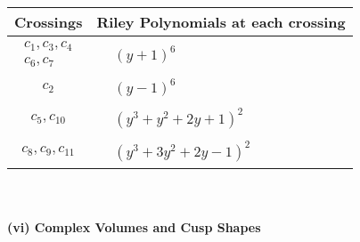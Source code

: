 \documentclass[1p]{elsarticle_modified}
\theoremstyle{definition}
\begin{document}
\begin{tabular}{m{50pt}|m{274pt}}
Crossings & \hspace{64pt}Riley Polynomials at each crossing \\
\hline $$\begin{aligned}c_{1},c_{3},c_{4}\\c_{6},c_{7}\end{aligned}$$&$\begin{aligned}
&(y+1)^6
\end{aligned}$\\
\hline $$\begin{aligned}c_{2}\end{aligned}$$&$\begin{aligned}
&(y-1)^6
\end{aligned}$\\
\hline $$\begin{aligned}c_{5},c_{10}\end{aligned}$$&$\begin{aligned}
&(y^3+y^2+2 y+1)^2
\end{aligned}$\\
\hline $$\begin{aligned}c_{8},c_{9},c_{11}\end{aligned}$$&$\begin{aligned}
&(y^3+3 y^2+2 y-1)^2
\end{aligned}$\\
\hline
\end{tabular}\\~\\
\newpage\flushleft \textbf{(vi) Complex Volumes and Cusp Shapes}
\end{document}
